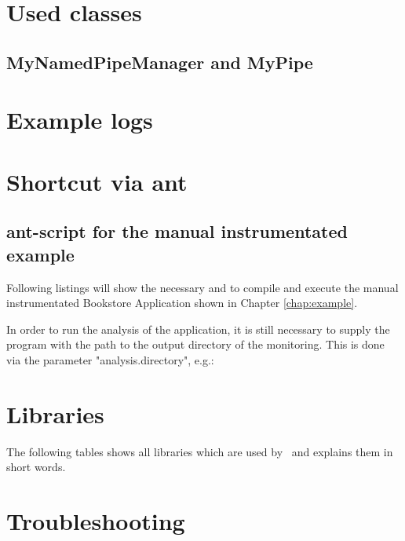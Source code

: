 \appendix
  \chapter{Used classes}
    \section{MyNamedPipeManager and MyPipe}
      \setJavaCodeListing
      

      \setJavaCodeListing
      

  \chapter{Example logs}
	
  \chapter{Shortcut via ant}
    \section{ant-script for the manual instrumentated example}
      Following listings will show the necessary  and  to compile and execute the manual instrumentated Bookstore Application shown in Chapter \ref{chap:example}.
     \setXMLListing
     
     
     In order to run the analysis of the application, it is still necessary to supply the program with the path to the output directory of the monitoring. This is done via the parameter "analysis.directory", e.g.:
     \setBashListing
     

  \chapter{Libraries}
    The following tables shows all libraries which are used by \Kieker\ and explains them in short words.
    

\chapter{Troubleshooting}
